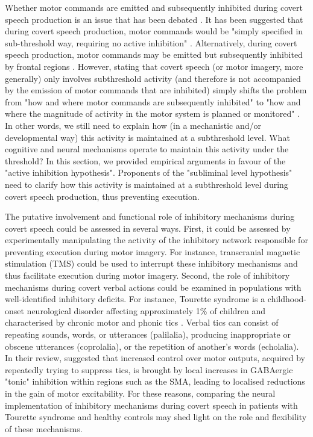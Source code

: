 \documentclass[utf8]{template/frontiersSCNS} %
\begin{document}
Whether motor commands are emitted and subsequently inhibited during covert speech production is an issue that has been debated \citep[e.g.,][]{geva_inner_2018}. It has been suggested that during covert speech production, motor commands would be "simply specified in sub-threshold way, requiring no active inhibition" \citep{geva_inner_2018}. Alternatively, during covert speech production, motor commands may be emitted but subsequently inhibited by frontal regions \citep[e.g.,][]{loevenbruck_cognitive_2018, grandchamp_condialint_2019}. However, stating that covert speech (or motor imagery, more generally) only involves subthreshold activity (and therefore is not accompanied by the emission of motor commands that are inhibited) simply shifts the problem from "how and where motor commands are subsequently inhibited" to "how and where the magnitude of activity in the motor system is planned or monitored" \citep[see also][]{scheil_motor_2018}. In other words, we still need to explain how (in a mechanistic and/or developmental way) this activity is maintained at a subthreshold level. What cognitive and neural mechanisms operate to maintain this activity under the threshold? In this section, we provided empirical arguments in favour of the "active inhibition hypothesis". Proponents of the "subliminal level hypothesis" need to clarify how this activity is maintained at a subthreshold level during covert speech production, thus preventing execution.


The putative involvement and functional role of inhibitory mechanisms during covert speech could be assessed in several ways. First, it could be assessed by experimentally manipulating the activity of the inhibitory network responsible for preventing execution during motor imagery. For instance, transcranial magnetic stimulation (TMS) could be used to interrupt these inhibitory mechanisms and thus facilitate execution during motor imagery. Second, the role of inhibitory mechanisms during covert verbal actions could be examined in populations with well-identified inhibitory deficits. For instance, Tourette syndrome is a childhood-onset neurological disorder affecting approximately 1\% of children and characterised by chronic motor and phonic tics \citep{jackson_inhibition_2015}. Verbal tics can consist of repeating sounds, words, or utterances (palilalia), producing inappropriate or obscene utterances (coprolalia), or the repetition of another’s words (echolalia). In their review, \cite{jackson_inhibition_2015} suggested that increased control over motor outputs, acquired by repeatedly trying to suppress tics, is brought by local increases in GABAergic "tonic" inhibition within regions such as the SMA, leading to localised reductions in the gain of motor excitability. For these reasons, comparing the neural implementation of inhibitory mechanisms during covert speech in patients with Tourette syndrome and healthy controls may shed light on the role and flexibility of these mechanisms.
\end{document}
